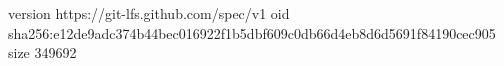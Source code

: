 version https://git-lfs.github.com/spec/v1
oid sha256:e12de9adc374b44bec016922f1b5dbf609c0db66d4eb8d6d5691f84190cec905
size 349692
